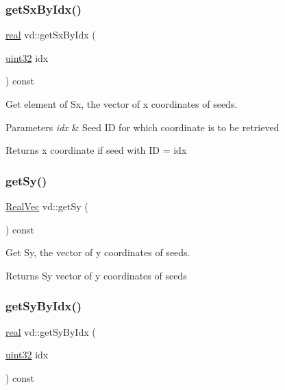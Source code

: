 \subsubsection{\texorpdfstring{get\+Sx\+By\+Idx()}{getSxByIdx()}}
{\footnotesize\ttfamily \mbox{\hyperlink{typedefs_8h_a58a0c7cf2501f4492da833421be92547}{real}} vd\+::get\+Sx\+By\+Idx (\begin{DoxyParamCaption}\item[{\mbox{\hyperlink{typedefs_8h_a8ad23e2333787a214e20a58a284a5a60}{uint32}}}]{idx }\end{DoxyParamCaption}) const}



Get element of Sx, the vector of x coordinates of seeds. 


\begin{DoxyParams}{Parameters}
{\em idx} & Seed ID for which coordinate is to be retrieved \\
\hline
\end{DoxyParams}
\begin{DoxyReturn}{Returns}
x coordinate if seed with ID = idx 
\end{DoxyReturn}
\mbox{\label{classvd_a704c56db9a9782e1c82d3d199ddfd699}} 
\subsubsection{\texorpdfstring{get\+Sy()}{getSy()}}
{\footnotesize\ttfamily \mbox{\hyperlink{typedefs_8h_a84b6d9a0fbb45e01ad4a3aa5667f2992}{Real\+Vec}} vd\+::get\+Sy (\begin{DoxyParamCaption}{ }\end{DoxyParamCaption}) const}



Get Sy, the vector of y coordinates of seeds. 

\begin{DoxyReturn}{Returns}
Sy vector of y coordinates of seeds 
\end{DoxyReturn}
\mbox{\label{classvd_a0f630fc80e57d3e17ab036f75afde006}} 
\subsubsection{\texorpdfstring{get\+Sy\+By\+Idx()}{getSyByIdx()}}
{\footnotesize\ttfamily \mbox{\hyperlink{typedefs_8h_a58a0c7cf2501f4492da833421be92547}{real}} vd\+::get\+Sy\+By\+Idx (\begin{DoxyParamCaption}\item[{\mbox{\hyperlink{typedefs_8h_a8ad23e2333787a214e20a58a284a5a60}{uint32}}}]{idx }\end{DoxyParamCaption}) const}



